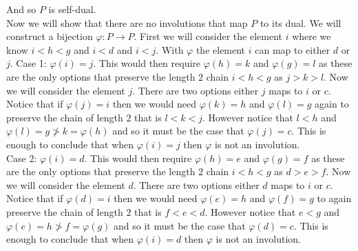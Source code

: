 \documentclass[12pt]{amsart}
\theoremstyle{definition}
\newcommand{\ra}{\rightarrow}
\let\phi\varphi
\begin{document}
\begin{itemize}
\begin{center}
\begin{tikzpicture}
        \end{tikzpicture}
        \end{center}

        And so $P$ is self-dual.\\
        
        Now we will show that there are no involutions that map $P$ to its dual. We will construct a bijection $\phi:P\ra P$. First we will consider the element $i$ where we know $i< h<g$ and $i<d$ and $i<j$. With $\phi$ the element $i$ can map to either $d$ or $j$.
        Case 1: $\phi(i)=j$. This would then require $\phi(h)=k$ and $\phi(g)=l$ as these are the only options that preserve the length $2$ chain $i<h<g$ as $j>k>l$. Now we will consider the element $j$. There are two options either $j$ maps to $i$ or $c$. Notice that if $\phi(j)=i$ then we would need $\phi(k)=h$ and $\phi(l)=g$ again to preserve the chain of length $2$ that is $l<k<j$. However notice that $l<h$ and $\phi(l)=g\not>k=\phi(h)$ and so it must be the case that $\varphi(j)=c$. This is enough to conclude that when $\phi(i)=j$ then $\phi$ is not an involution.\\



        Case 2: $\phi(i)=d$. This would then require $\phi(h)=e$ and $\phi(g)=f$ as these are the only options that preserve the length $2$ chain $i<h<g$ as $d>e>f$. Now we will consider the element $d$. There are two options either $d$ maps to $i$ or $c$. Notice that if $\phi(d)=i$ then we would need $\phi(e)=h$ and $\phi(f)=g$ to again preserve the chain of length $2$ that is $f<e<d$. However notice that $e<g$ and $\phi(e)=h\not>f=\phi(g)$ and so it must be the case that $\varphi(d)=c$. This is enough to conclude that when $\phi(i)=d$ then $\phi$ is not an involution.
        
\end{itemize}
\end{document}
